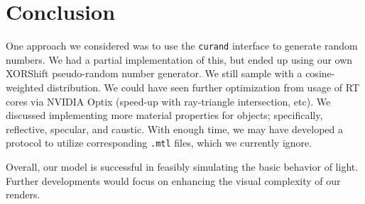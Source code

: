 \documentclass[../main.tex]{subfiles}
\begin{document}
\section{Conclusion}

One approach we considered was to use the \texttt{curand} interface to generate
random numbers. We had a partial implementation of this, but ended up using our
own XORShift pseudo-random number generator. We still sample with a
cosine-weighted distribution. We could have seen further optimization from
usage of RT cores via NVIDIA Optix (speed-up with ray-triangle intersection,
etc). We discussed implementing more material properties for objects;
specifically, reflective, specular, and caustic. With enough time, we may have
developed a protocol to utilize corresponding \texttt{.mtl} files, which we
currently ignore.

Overall,
our model is successful in feasibly simulating the basic behavior of light.
Further developments would focus on enhancing the visual complexity of
our renders.

\ifSubfilesClassLoaded{%
    \nocite{*}
    \twocolumn
}{}
\end{document}
